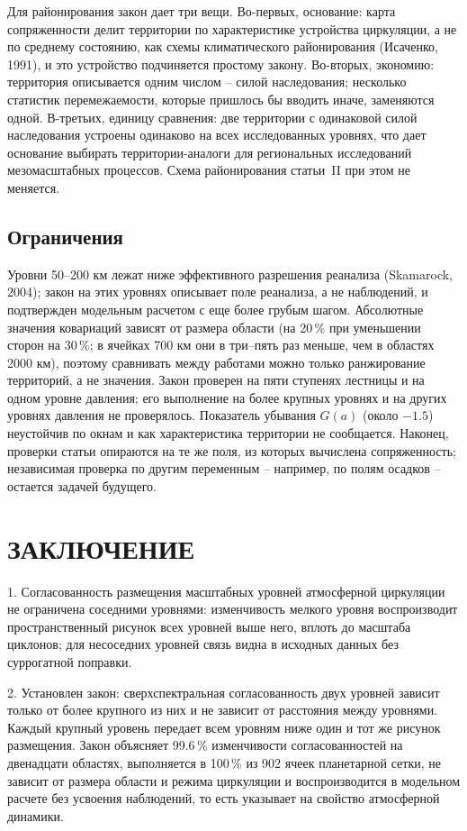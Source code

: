\documentclass[12pt,a4paper]{article}
\begin{document}
Для районирования закон дает три вещи. Во-первых, основание: карта сопряженности делит территории по характеристике устройства циркуляции, а не по среднему состоянию, как схемы климатического районирования (Исаченко, 1991), и это устройство подчиняется простому закону. Во-вторых, экономию: территория описывается одним числом -- силой наследования; несколько статистик перемежаемости, которые пришлось бы вводить иначе, заменяются одной. В-третьих, единицу сравнения: две территории с одинаковой силой наследования устроены одинаково на всех исследованных уровнях, что дает основание выбирать территории-аналоги для региональных исследований мезомасштабных процессов. Схема районирования статьи~II при этом не меняется.

\subsection{Ограничения}

Уровни 50--200 км лежат ниже эффективного разрешения реанализа (Skamarock, 2004); закон на этих уровнях описывает поле реанализа, а не наблюдений, и подтвержден модельным расчетом с еще более грубым шагом. Абсолютные значения ковариаций зависят от размера области (на 20\,\% при уменьшении сторон на 30\,\%; в ячейках 700 км они в три--пять раз меньше, чем в областях 2000 км), поэтому сравнивать между работами можно только ранжирование территорий, а не значения. Закон проверен на пяти ступенях лестницы и на одном уровне давления; его выполнение на более крупных уровнях и на других уровнях давления не проверялось. Показатель убывания $G(a)$ (около $-1.5$) неустойчив по окнам и как характеристика территории не сообщается. Наконец, проверки статьи опираются на те же поля, из которых вычислена сопряженность; независимая проверка по другим переменным -- например, по полям осадков -- остается задачей будущего.

\section{ЗАКЛЮЧЕНИЕ}

1. Согласованность размещения масштабных уровней атмосферной циркуляции не ограничена соседними уровнями: изменчивость мелкого уровня воспроизводит пространственный рисунок всех уровней выше него, вплоть до масштаба циклонов; для несоседних уровней связь видна в исходных данных без суррогатной поправки.

2. Установлен закон: сверхспектральная согласованность двух уровней зависит только от более крупного из них и не зависит от расстояния между уровнями. Каждый крупный уровень передает всем уровням ниже один и тот же рисунок размещения. Закон объясняет 99.6\,\% изменчивости согласованностей на двенадцати областях, выполняется в 100\,\% из 902 ячеек планетарной сетки, не зависит от размера области и режима циркуляции и воспроизводится в модельном расчете без усвоения наблюдений, то есть указывает на свойство атмосферной динамики.
\end{document}
